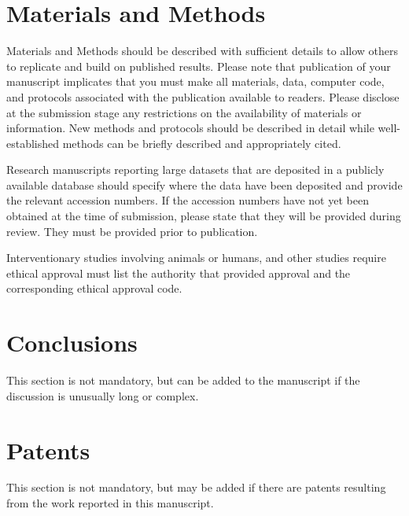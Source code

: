 \documentclass[journal,article,submit,moreauthors,pdftex,10pt,a4paper]{Definitions/mdpi}
\theoremstyle{plain}
\theoremstyle{definition}
\theoremstyle{remark}
\begin{document}
\section{Materials and Methods}

Materials and Methods should be described with sufficient details to allow others to replicate and build on published results. Please note that publication of your manuscript implicates that you must make all materials, data, computer code, and protocols associated with the publication available to readers. Please disclose at the submission stage any restrictions on the availability of materials or information. New methods and protocols should be described in detail while well-established methods can be briefly described and appropriately cited.

Research manuscripts reporting large datasets that are deposited in a publicly available database should specify where the data have been deposited and provide the relevant accession numbers. If the accession numbers have not yet been obtained at the time of submission, please state that they will be provided during review. They must be provided prior to publication.

Interventionary studies involving animals or humans, and other studies require ethical approval must list the authority that provided approval and the corresponding ethical approval code. 

\section{Conclusions}

This section is not mandatory, but can be added to the manuscript if the discussion is unusually long or complex.

\section{Patents}
This section is not mandatory, but may be added if there are patents resulting from the work reported in this manuscript.

\vspace{6pt} 

\end{document}
